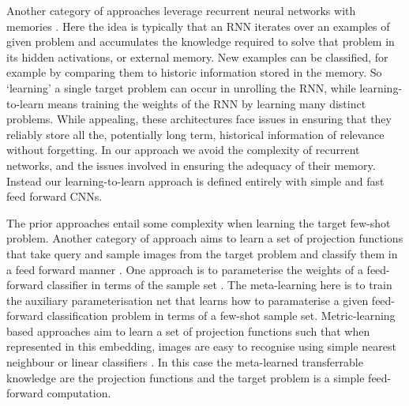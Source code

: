 \documentclass[10pt,twocolumn,letterpaper]{article}
\begin{document}
 Another category of approaches leverage recurrent neural networks with memories \cite{munkhdalai2017meta,santoro2016meta}. Here the idea is typically that an RNN iterates over an examples of given problem and accumulates the knowledge required to solve that problem in its hidden activations, or external memory. New examples can be classified, for example by comparing them to historic information stored in the memory. So `learning' a  single target problem can occur in unrolling the RNN, while learning-to-learn means training the weights of the RNN by learning many distinct problems. While appealing, these architectures face issues in ensuring that they reliably store all the, potentially long term, historical information of relevance without forgetting. In our approach we avoid the complexity of recurrent networks, and the issues involved in ensuring the adequacy of their memory. Instead our learning-to-learn approach is defined entirely with simple and fast feed forward CNNs. 



 The prior approaches entail some complexity when learning the target few-shot problem. Another category of approach aims to learn a set of projection functions that take query and sample images from the target problem and classify them in a feed forward manner \cite{vinyals2016matching,snell2017prototypical,bertinetto2016feedForwardOneShot}.  One approach is to parameterise the weights of a feed-forward classifier in terms of the sample set \cite{bertinetto2016feedForwardOneShot}. The meta-learning here is to train the auxiliary parameterisation net that learns how to paramaterise a given feed-forward classification problem in terms of a few-shot sample set. Metric-learning based approaches aim to learn a set of projection functions such that when represented in this embedding, images are easy to recognise using simple nearest neighbour or linear classifiers \cite{vinyals2016matching,snell2017prototypical,koch2015siamese}. In this case the meta-learned transferrable knowledge are the projection functions and the target problem is a simple feed-forward computation.
\end{document}
